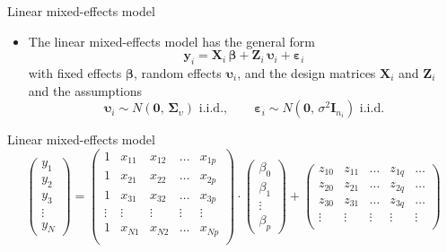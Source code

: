 \documentclass[aspectratio=169]{beamer}
\newcommand{\vect}[1]{\mathbf{#1}}
\newcommand{\mat}[1]{\mathbf{#1}}
\newcommand{\gvect}[1]{\boldsymbol{#1}}
\newcommand{\gmat}[1]{\boldsymbol{#1}}
\begin{document}
\begin{frame}{Linear mixed-effects model}
  \begin{itemize}
    \item The linear mixed-effects model has the general form
\[
  \vect{y}_i = \mat{X}_i \, \gvect{\beta} + \mat{Z}_i \, \gvect{\upsilon}_i +
               \gvect{\varepsilon}_i
\]
with fixed effects $\gvect{\beta}$, random effects
$\gvect{\upsilon}_i$, and the design matrices $\mat{X}_i$ and $\mat{Z}_i$
  and the assumptions
\[
  \gvect{\upsilon}_i \sim N(\vect{0}, \, \gmat{\Sigma}_\upsilon)
    \text{ i.i.d.}, \qquad
  \gvect{\varepsilon}_i \sim N(\vect{0}, \, \sigma^2 \mat{I}_{n_i})
    \text{ i.i.d.}
\]
  \end{itemize}
\end{frame}

\begin{frame}[shrink=10]{Linear mixed-effects model}
\vspace{2cm}
\begin{equation*}
  \begin{pmatrix}
    y_1 \\
    y_2 \\
    y_3 \\
    \vdots \\
    y_N
  \end{pmatrix} = 
  \begin{pmatrix}
    1 & x_{11} & x_{12} & \dots & x_{1p} \\
    1 & x_{21} & x_{22} & \dots & x_{2p} \\
    1 & x_{31} & x_{32} & \dots & x_{3p} \\
    \vdots & \vdots & \vdots & \vdots & \vdots \\
    1 & x_{N1} & x_{N2} & \dots & x_{Np} \\
  \end{pmatrix} \cdot
  \begin{pmatrix}
    \beta_0 \\
    \beta_1 \\
    \vdots \\
    \beta_p
  \end{pmatrix} +
  \begin{pmatrix}
    z_{10} & z_{11} & \dots & z_{1q} & \dots \\
    z_{20} & z_{21} & \dots & z_{2q} & \dots \\
    z_{30} & z_{31} & \dots & z_{3q} & \dots \\
    \vdots & \vdots & \vdots & \vdots & \vdots \\

\end{pmatrix}
\end{equation*}
\end{frame}
\end{document}
